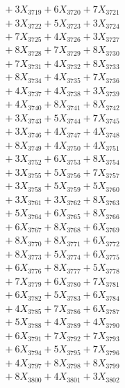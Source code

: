 \documentclass[a4paper,10pt]{article}
\begin{document}
{\begin{align}
&\;  + 3 X_{3719} + 6 X_{3720} + 7 X_{3721} \\[0.3ex]
&\;  + 3 X_{3722} + 5 X_{3723} + 3 X_{3724} \\[0.3ex]
&\;  + 7 X_{3725} + 4 X_{3726} + 3 X_{3727} \\[0.3ex]
&\;  + 8 X_{3728} + 7 X_{3729} + 8 X_{3730} \\[0.5ex]\allowbreak
&\;  + 7 X_{3731} + 4 X_{3732} + 8 X_{3733} \\[0.3ex]
&\;  + 8 X_{3734} + 4 X_{3735} + 7 X_{3736} \\[0.3ex]
&\;  + 4 X_{3737} + 4 X_{3738} + 3 X_{3739} \\[0.3ex]
&\;  + 4 X_{3740} + 8 X_{3741} + 8 X_{3742} \\[0.3ex]
&\;  + 3 X_{3743} + 5 X_{3744} + 7 X_{3745} \\[0.3ex]
&\;  + 3 X_{3746} + 4 X_{3747} + 4 X_{3748} \\[0.3ex]
&\;  + 8 X_{3749} + 4 X_{3750} + 4 X_{3751} \\[0.3ex]
&\;  + 3 X_{3752} + 6 X_{3753} + 8 X_{3754} \\[0.3ex]
&\;  + 3 X_{3755} + 5 X_{3756} + 7 X_{3757} \\[0.3ex]
&\;  + 3 X_{3758} + 5 X_{3759} + 5 X_{3760} \\[0.5ex]\allowbreak
&\;  + 3 X_{3761} + 3 X_{3762} + 8 X_{3763} \\[0.3ex]
&\;  + 5 X_{3764} + 6 X_{3765} + 8 X_{3766} \\[0.3ex]
&\;  + 6 X_{3767} + 8 X_{3768} + 6 X_{3769} \\[0.3ex]
&\;  + 8 X_{3770} + 8 X_{3771} + 6 X_{3772} \\[0.3ex]
&\;  + 8 X_{3773} + 5 X_{3774} + 6 X_{3775} \\[0.3ex]
&\;  + 6 X_{3776} + 8 X_{3777} + 5 X_{3778} \\[0.3ex]
&\;  + 7 X_{3779} + 6 X_{3780} + 7 X_{3781} \\[0.3ex]
&\;  + 6 X_{3782} + 5 X_{3783} + 6 X_{3784} \\[0.3ex]
&\;  + 4 X_{3785} + 7 X_{3786} + 6 X_{3787} \\[0.3ex]
&\;  + 5 X_{3788} + 4 X_{3789} + 4 X_{3790} \\[0.5ex]\allowbreak
&\;  + 6 X_{3791} + 7 X_{3792} + 7 X_{3793} \\[0.3ex]
&\;  + 6 X_{3794} + 5 X_{3795} + 7 X_{3796} \\[0.3ex]
&\;  + 4 X_{3797} + 8 X_{3798} + 8 X_{3799} \\[0.3ex]
&\;  + 8 X_{3800} + 4 X_{3801} + 3 X_{3802} \\[0.3ex]

\end{align}}
\end{document}
